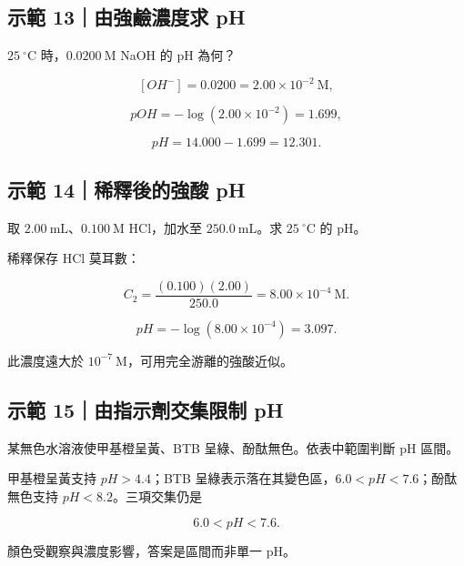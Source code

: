 \documentclass[11pt,a4paper]{article}
\begin{document}
\begin{HandoutWorkedExample}

\subsection{示範 13｜由強鹼濃度求 pH}\label{ux793aux7bc4-13ux7531ux5f37ux9e7cux6fc3ux5ea6ux6c42-ph}

\(25\ ^\circ\mathrm C\) 時，\(0.0200\ \mathrm M\) NaOH 的 pH 為何？

\[
[OH^-]=0.0200=2.00\times10^{-2}\ \mathrm M,
\]

\[
pOH=-\log(2.00\times10^{-2})=1.699,
\]

\[
pH=14.000-1.699=12.301.
\]

\end{HandoutWorkedExample}

\begin{HandoutWorkedExample}

\subsection{示範 14｜稀釋後的強酸 pH}\label{ux793aux7bc4-14ux7a00ux91cbux5f8cux7684ux5f37ux9178-ph}

取 \(2.00\ \mathrm{mL}\)、\(0.100\ \mathrm M\) HCl，加水至 \(250.0\ \mathrm{mL}\)。求 \(25\ ^\circ\mathrm C\) 的 pH。

稀釋保存 HCl 莫耳數：

\[
C_2=\frac{(0.100)(2.00)}{250.0}=8.00\times10^{-4}\ \mathrm M.
\]

\[
pH=-\log(8.00\times10^{-4})=3.097.
\]

此濃度遠大於 \(10^{-7}\ \mathrm M\)，可用完全游離的強酸近似。

\end{HandoutWorkedExample}

\begin{HandoutWorkedExample}

\subsection{示範 15｜由指示劑交集限制 pH}\label{ux793aux7bc4-15ux7531ux6307ux793aux5291ux4ea4ux96c6ux9650ux5236-ph}

某無色水溶液使甲基橙呈黃、BTB 呈綠、酚酞無色。依表中範圍判斷 pH 區間。

甲基橙呈黃支持 \(pH>4.4\)；BTB 呈綠表示落在其變色區，\(6.0<pH<7.6\)；酚酞無色支持 \(pH<8.2\)。三項交集仍是

\[
6.0<pH<7.6.
\]

顏色受觀察與濃度影響，答案是區間而非單一 pH。

\end{HandoutWorkedExample}
\end{document}
